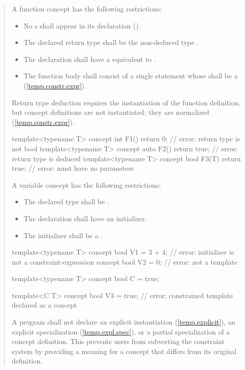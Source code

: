 \begin{quote}
\pnum
A function concept has the following restrictions:
\begin{itemize}
\item No s shall
     appear in its declaration ().
\item The declared return type shall be the non-deduced type .

\item The declaration shall have a 
equivalent to \tcode{()}.

\item The function body shall consist of a single  
statement whose  shall be a
 (\ref{temp.constr.expr}).
\end{itemize}
%
\enternote
Return type deduction requires the instantiation of the function 
definition, but concept definitions are not instantiated; they
are normalized (\ref{temp.constr.expr}).
\exitnote
%
\enterexample
\begin{codeblock}
template<typename T> 
  concept int F1() { return 0; }      // error: return type is not bool
template<typename T> 
  concept auto F2() { return true; }  // error: return type is deduced
template<typename T> 
  concept bool F3(T) { return true; } // error: must have no parameters
\end{codeblock}
\exitexample

\pnum
A variable concept has the following restrictions:
\begin{itemize}
\item The declared type shall be .
\item The declaration shall have an initializer.
\item The initializer shall be a .
\end{itemize}
%
\enterexample
\begin{codeblock}
template<typename T> 
  concept bool V1 = 3 + 4; // error: initializer is not a constraint-expression
concept bool V2 = 0;       // error: not a template

template<typename T> concept bool C = true;

template<C T> 
  concept bool V3 = true;  // error: constrained template declared as a concept
\end{codeblock}
\exitexample

\pnum
A program shall not declare an explicit instantiation (\ref{temp.explicit}), 
an explicit specialization (\ref{temp.expl.spec}), or a partial specialization
of a concept definition.
%
\enternote
This prevents users from subverting the constraint system by providing a 
meaning for a concept that differs from its original definition.
\exitnote

\end{quote}
